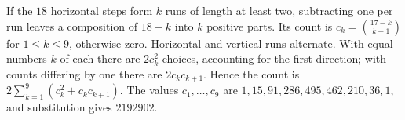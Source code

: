 If the $18$ horizontal steps form $k$ runs of length at least two, subtracting one per run leaves a composition of $18-k$ into $k$ positive parts. Its count is $c_k=\binom{17-k}{k-1}$ for $1\le k\le9$, otherwise zero. Horizontal and vertical runs alternate. With equal numbers $k$ of each there are $2c_k^2$ choices, accounting for the first direction; with counts differing by one there are $2c_kc_{k+1}$. Hence the count is $2\sum_{k=1}^9(c_k^2+c_kc_{k+1})$. The values $c_1,\ldots,c_9$ are $1,15,91,286,495,462,210,36,1$, and substitution gives $\boxed{2192902}$.
